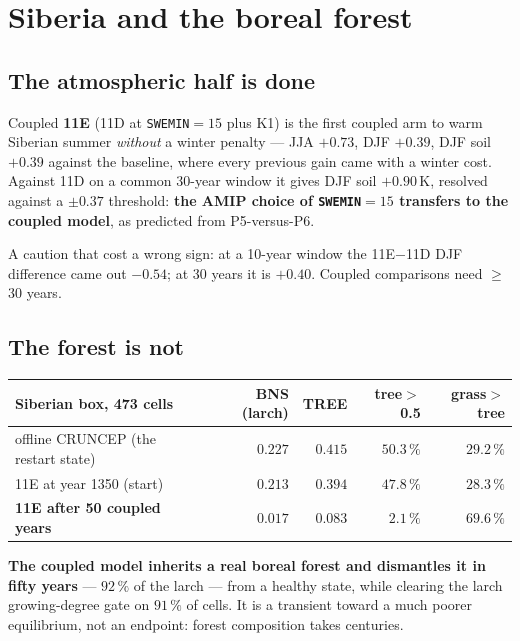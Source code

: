 \documentclass[10pt]{article}
\begin{document}
\section{Siberia and the boreal forest}\label{sec:sib}

\subsection{The atmospheric half is done}
Coupled \textbf{11E} (11D at \texttt{SWEMIN}$=15$ plus K1) is the first coupled arm to warm
Siberian summer \emph{without} a winter penalty --- JJA $+0.73$, DJF $+0.39$, DJF soil
$+0.39$ against the baseline, where every previous gain came with a winter cost. Against
11D on a common 30-year window it gives DJF soil $\mathbf{+0.90}$\,K, resolved against a
$\pm0.37$ threshold: \textbf{the AMIP choice of \texttt{SWEMIN}$=15$ transfers to the
coupled model}, as predicted from P5-versus-P6.

A caution that cost a wrong sign: at a 10-year window the 11E$-$11D DJF difference came out
$-0.54$; at 30 years it is $+0.40$. Coupled comparisons need $\geq$30 years.

\subsection{The forest is not}
\begin{center}\footnotesize
\begin{tabular}{l r r r r}
\toprule
Siberian box, 473 cells & BNS (larch) & TREE & tree$>$0.5 & grass$>$tree \\
\midrule
offline CRUNCEP (the restart state) & $0.227$ & $0.415$ & $50.3\,\%$ & $29.2\,\%$ \\
11E at year 1350 (start) & $0.213$ & $0.394$ & $47.8\,\%$ & $28.3\,\%$ \\
\textbf{11E after 50 coupled years} & $\mathbf{0.017}$ & $\mathbf{0.083}$ & $2.1\,\%$ & $\mathbf{69.6\,\%}$ \\
\bottomrule
\end{tabular}
\end{center}

\noindent \textbf{The coupled model inherits a real boreal forest and dismantles it in
fifty years} --- $92\,\%$ of the larch --- from a healthy state, while clearing the larch
growing-degree gate on $91\,\%$ of cells. It is a transient toward a much poorer
equilibrium, not an endpoint: forest composition takes centuries.
\end{document}
